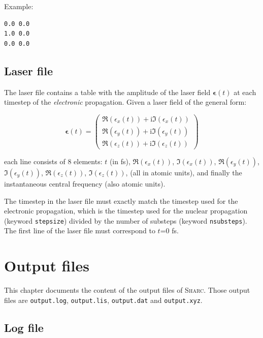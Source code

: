 \documentclass[a4paper,11pt,DIV=15,openany,twoside=false]{scrbook}
\newcommand{\tthdump}[1]{#1}
\newcommand{\sharc}{\textsc{Sharc}}
\newcommand{\ttt}[1]{\texttt{#1}}
\newcommand{\I}{\ensuremath{\mathrm{i}}}
\newenvironment{example}{
  \vspace{0mm}
  \definecolor{shadecolor}{HTML}{BBDDFF}
  \begin{shaded}
  \begin{minipage}{0.9\textwidth}
}{
  \end{minipage}
  \end{shaded}
}
\begin{document}
Example:
\begin{example}
  \begin{verbatim}
0.0 0.0
1.0 0.0
0.0 0.0
  \end{verbatim}
\end{example}

\section{Laser file}\label{sec:laserfile}

The laser file contains a table with the amplitude of the laser field $\boldsymbol{\epsilon}(t)$ at each timestep of the \textit{electronic} propagation. Given a laser field of the general form:
\tthdump{
  \begin{equation}
    \boldsymbol{\epsilon}(t)=
    \begin{pmatrix}
      \Re(\epsilon_x(t))+\I \Im(\epsilon_x(t))\\
      \Re(\epsilon_y(t))+\I \Im(\epsilon_y(t))\\
      \Re(\epsilon_z(t))+\I \Im(\epsilon_z(t))
    \end{pmatrix}
  \end{equation}
}
each line consists of 8 elements: $t$ (in fs), $\Re(\epsilon_x(t))$, $\Im(\epsilon_x(t))$, $\Re(\epsilon_y(t))$, $\Im(\epsilon_y(t))$, $\Re(\epsilon_z(t))$, $\Im(\epsilon_z(t))$, (all in atomic units), and finally the instantaneous central frequency (also atomic units).

The timestep in the laser file must exactly match the timestep used for the electronic propagation, which is the timestep used for the nuclear propagation (keyword \ttt{stepsize}) divided by the number of substeps (keyword \ttt{nsubsteps}). The first line of the laser file must correspond to $t$=0 fs.

\chapter{Output files}\label{chap:output}

This chapter documents the content of the output files of \sharc. Those output files are \ttt{output.log}, \ttt{output.lis}, \ttt{output.dat} and \ttt{output.xyz}.

\section{Log file}\label{sec:logfile}
\end{document}
